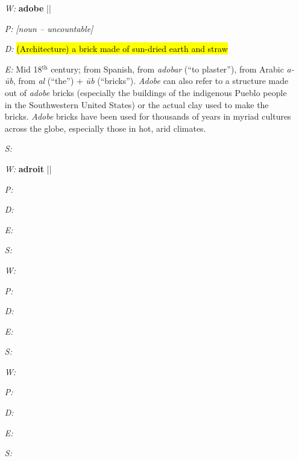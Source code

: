 \documentclass[11pt, table, dvipsnames, svgnames, x11names, xcdraw, titlepage]{article}
\begin{document}
\null

\begin{itemize}[itemsep=0pt, topsep=0pt]
\item[\textit{W:}] \textbf{adobe} \quad || \quad {}
\item[\textit{P:}] \textit{[noun – uncountable]}
\item[\textit{D:}] \hl{{\footnotesize (\textsf{Architecture})}\,\,}\hl{a brick made of sun-dried earth and straw}
\item[\textit{E:}] Mid 18$^{\text{th}}$ century; from Spanish, from \textit{adobar} (``to plaster''), from Arabic \textit{a-\={u}b}, from \textit{al} (``the'') + \textit{\={u}b} (``bricks''). \textit{Adobe} can also refer to a structure made out of \textit{adobe} bricks (especially the buildings of the indigenous Pueblo people in the Southwestern United States) or the actual clay used to make the bricks. \textit{Adobe} bricks have been used for thousands of years in myriad cultures across the globe, especially those in hot, arid climates. 
\item[\textit{S:}]
\end{itemize}

\null

\begin{itemize}[itemsep=0pt, topsep=0pt]
\item[\textit{W:}] \textbf{adroit} \quad || \quad {}
\item[\textit{P:}]
\item[\textit{D:}]
\item[\textit{E:}]
\item[\textit{S:}]
\end{itemize}

\null

\begin{itemize}[itemsep=0pt, topsep=0pt]
\item[\textit{W:}] 
\item[\textit{P:}]
\item[\textit{D:}]
\item[\textit{E:}]
\item[\textit{S:}]
\end{itemize}

\null

\begin{itemize}[itemsep=0pt, topsep=0pt]
\item[\textit{W:}] 
\item[\textit{P:}]
\item[\textit{D:}]
\item[\textit{E:}]
\item[\textit{S:}]
\end{itemize}
\end{document}
